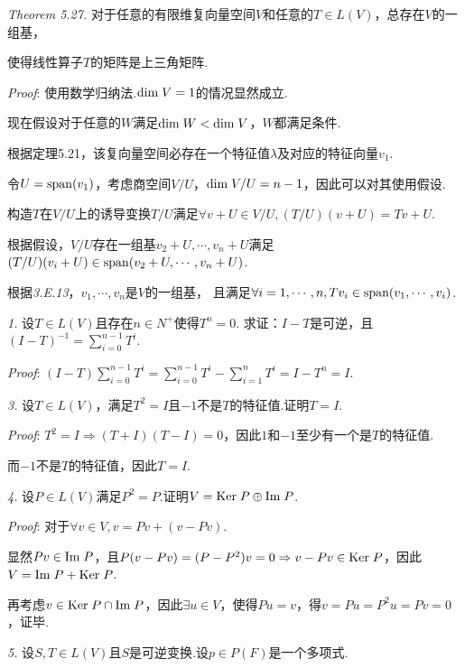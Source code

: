 \textit{Theorem 5.27.}
对于任意的有限维复向量空间$V$和任意的$T \in L(V)$，总存在$V$的一组基，

使得线性算子$T$的矩阵是上三角矩阵.

\textit{Proof}:
使用数学归纳法.$\mathrm{dim \;} V=1$的情况显然成立.

现在假设对于任意的$W$满足$\mathrm{dim \;} W<\mathrm{dim \;} V$，$W$都满足条件.

根据定理5.21，该复向量空间必存在一个特征值$\lambda$及对应的特征向量$v_1$.

令$U=\mathrm{span}(v_1)$，考虑商空间$V/U$，$\mathrm{dim \;} V/U=n-1$，因此可以对其使用假设.

构造$T$在$V/U$上的诱导变换$T/U$满足$\forall v+U \in V/U,(T/U)(v+U)=Tv+U$.

根据假设，$V/U$存在一组基$v_2+U,\cdots,v_n+U$满足$(T/U)(v_i+U) \in \mathrm{span}(v_2+U,\cdots,v_n+U)$.

根据\textit{3.E.13}，$v_1,\cdots,v_n$是$V$的一组基，
且满足$\forall i=1,\cdots,n,Tv_i \in \mathrm{span}(v_1,\cdots,v_i)$.

\hspace*{\fill}

\textit{1.}
设$T \in L(V)$且存在$n \in N^+$使得$T^n=0$.
求证：$I-T$是可逆，且$(I-T)^{-1}=\sum_{i=0}^{n-1} T^i$.

\textit{Proof}:
$(I-T)\sum_{i=0}^{n-1} T^i=\sum_{i=0}^{n-1} T^i-\sum_{i=1}^n T^i=I-T^n=I$.

\hspace*{\fill}

\textit{3.}
设$T \in L(V)$，满足$T^2=I$且$-1$不是$T$的特征值.证明$T=I$.

\textit{Proof}:
$T^2=I \Rightarrow (T+I)(T-I)=0$，因此$1$和$-1$至少有一个是$T$的特征值.

而$-1$不是$T$的特征值，因此$T=I$.

\hspace*{\fill}

\textit{4.}
设$P \in L(V)$满足$P^2=P$.证明$V=\mathrm{Ker \;} P \oplus \mathrm{Im \;} P$.

\textit{Proof}:
对于$\forall v \in V,v=Pv+(v-Pv)$.

显然$Pv \in \mathrm{Im \;} P$，且$P(v-Pv)=(P-P^2)v=0 \Rightarrow v-Pv \in \mathrm{Ker \;} P$，因此$V=\mathrm{Im \;} P+\mathrm{Ker \;} P$.

再考虑$v \in \mathrm{Ker \;} P \cap \mathrm{Im \;} P$，因此$\exists u \in V$，使得$Pu=v$，得$v=Pu=P^2u=Pv=0$，证毕.

\hspace*{\fill}

\textit{5.}
设$S,T \in L(V)$且$S$是可逆变换.设$p \in P(F)$是一个多项式.

